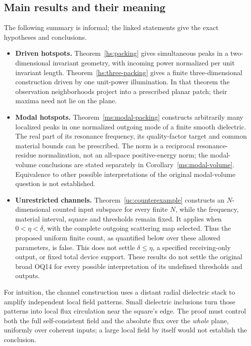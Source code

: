 \subsection{Main results and their meaning}
The following summary is informal; the linked statements give the exact
hypotheses and conclusions.
\begin{itemize}
\item \textbf{Driven hotspots.}  Theorem~\ref{hs:packing} gives
  simultaneous peaks in a two-dimensional invariant geometry, with incoming
  power normalized per unit invariant length.  Theorem~\ref{hs:three-packing}
  gives a finite three-dimensional construction driven by one unit-power
  illumination.  In that theorem the observation neighborhoods project into
  a prescribed planar patch; their maxima need not lie on the plane.
\item \textbf{Modal hotspots.}  Theorem~\ref{ms:modal-packing} constructs
  arbitrarily many localized peaks in one normalized outgoing mode of a
  finite smooth dielectric.  The real part of its resonance frequency, its
  quality-factor target and common material bounds can be prescribed. The
  norm is a reciprocal resonance-residue normalization, not an all-space
  positive-energy norm;
  the modal-volume conclusions are stated separately in
  Corollary~\ref{ms:modal-volume}. Equivalence to other possible
  interpretations of the original modal-volume question is not established.
\item \textbf{Unrestricted channels.}  Theorem~\ref{uc:counterexample}
  constructs an $N$-dimensional counted input subspace for every finite
  $N$, while the frequency, material interval, square and thresholds remain
  fixed.  It applies when $0<\eta<\delta$, with the complete outgoing
  scattering map selected.  Thus the proposed uniform finite count, as
  quantified below over these allowed parameters, is false.  This does not
  settle $\delta\leq\eta$, a specified receiving-only output, or fixed total
  device support. These results do not settle the original broad OQ14 for
  every possible interpretation of its undefined thresholds and outputs.
\end{itemize}
For intuition, the channel construction uses a distant radial dielectric
stack to amplify independent local field patterns.  Small dielectric
inclusions turn those patterns into local flux circulation near the square's
edge.  The proof must control both the full self-consistent field and the
absolute flux over the \emph{whole} plane, uniformly over coherent inputs;
a large local field by itself would not establish the conclusion.

